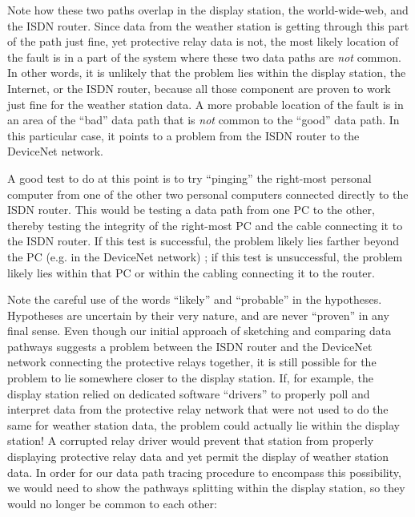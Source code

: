 Note how these two paths overlap in the display station, the world-wide-web, and the ISDN router.  Since data from the weather station is getting through this part of the path just fine, yet protective relay data is not, the most likely location of the fault is in a part of the system where these two data paths are \textit{not} common.  In other words, it is unlikely that the problem lies within the display station, the Internet, or the ISDN router, because all those component are proven to work just fine for the weather station data.  A more probable location of the fault is in an area of the ``bad'' data path that is \textit{not} common to the ``good'' data path.  In this particular case, it points to a problem from the ISDN router to the DeviceNet network.

A good test to do at this point is to try ``pinging'' the right-most personal computer from one of the other two personal computers connected directly to the ISDN router.  This would be testing a data path from one PC to the other, thereby testing the integrity of the right-most PC and the cable connecting it to the ISDN router.  If this test is successful, the problem likely lies farther beyond the PC (e.g. in the DeviceNet network) ; if this test is unsuccessful, the problem likely lies within that PC or within the cabling connecting it to the router.

\vskip 10pt

\filbreak

Note the careful use of the words ``likely'' and ``probable'' in the hypotheses.  Hypotheses are uncertain by their very nature, and are never ``proven'' in any final sense.  Even though our initial approach of sketching and comparing data pathways suggests a problem between the ISDN router and the DeviceNet network connecting the protective relays together, it is still possible for the problem to lie somewhere closer to the display station.  If, for example, the display station relied on dedicated software ``drivers'' to properly poll and interpret data from the protective relay network that were not used to do the same for weather station data, the problem could actually lie within the display station!  A corrupted relay driver would prevent that station from properly displaying protective relay data and yet permit the display of weather station data.  In order for our data path tracing procedure to encompass this possibility, we would need to show the pathways splitting within the display station, so they would no longer be common to each other:

